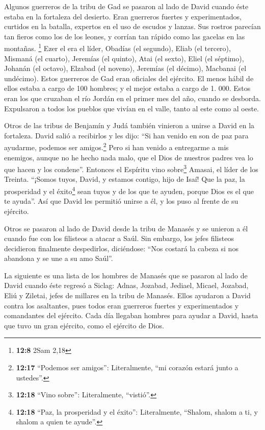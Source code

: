  Algunos guerreros de la tribu de Gad se pasaron al lado
de David cuando éste estaba en la fortaleza del desierto. Eran guerreros
fuertes y experimentados, curtidos en la batalla, expertos en el uso de
escudos y lanzas. Sus rostros parecían tan fieros como los de los
leones, y corrían tan rápido como las gacelas en las montañas.
\footnote{\textbf{12:8} 2Sam 2,18}  Ezer el era el líder,
Obadías (el segundo), Eliab (el tercero),  Mismaná (el
cuarto), Jeremías (el quinto),  Atai (el sexto), Eliel
(el séptimo),  Johanán (el octavo), Elzabad (el noveno),
 Jeremías (el décimo), Macbanai (el undécimo).
 Estos guerreros de Gad eran oficiales del ejército. El
menos hábil de ellos estaba a cargo de 100 hombres; y el mejor estaba a
cargo de 1. 000.  Estos eran los que cruzaban el río
Jordán en el primer mes del año, cuando se desborda. Expulsaron a todos
los pueblos que vivían en el valle, tanto al este como al oeste.

 Otros de las tribus de Benjamín y Judá también vinieron
a unirse a David en la fortaleza.  David salió a
recibirlos y les dijo: ``Si han venido en son de paz para ayudarme,
podemos ser amigos.\footnote{\textbf{12:17} ``Podemos ser amigos'':
  Literalmente, ``mi corazón estará junto a ustedes''.} Pero si han
venido a entregarme a mis enemigos, aunque no he hecho nada malo, que el
Dios de nuestros padres vea lo que hacen y los condene''.
 Entonces el Espíritu vino sobre\footnote{\textbf{12:18}
  ``Vino sobre'': Literalmente, ``vistió''.} Amasai, el líder de los
Treinta. ``¡Somos tuyos, David, y estamos contigo, hijo de Isaí! Que la
paz, la prosperidad y el éxito\footnote{\textbf{12:18} ``Paz, la
  prosperidad y el éxito'': Literalmente, ``Shalom, shalom a ti, y
  shalom a quien te ayude''.} sean tuyos y de los que te ayuden, porque
Dios es el que te ayuda''. Así que David les permitió unirse a él, y los
puso al frente de su ejército.

 Otros se pasaron al lado de David desde la tribu de
Manasés y se unieron a él cuando fue con los filisteos a atacar a Saúl.
Sin embargo, los jefes filisteos decidieron finalmente despedirlos,
diciéndose: ``Nos costará la cabeza si nos abandona y se une a su amo
Saúl''.

 La siguiente es una lista de los hombres de Manasés que
se pasaron al lado de David cuando éste regresó a Siclag: Adnas,
Jozabad, Jediael, Micael, Jozabad, Eliú y Ziletai, jefes de millares en
la tribu de Manasés.  Ellos ayudaron a David contra los
asaltantes, pues todos eran guerreros fuertes y experimentados y
comandantes del ejército.  Cada día llegaban hombres para
ayudar a David, hasta que tuvo un gran ejército, como el ejército de
Dios.

